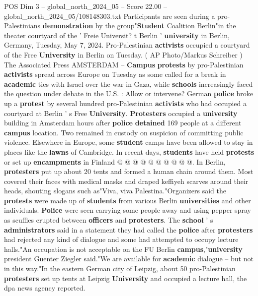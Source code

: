 \begin{textsample}{POS Dim 3 – global\_north\_2024\_05 – Score 22.00 – global\_north\_2024\_05/108148303.txt}  \label{ex:f3_pos_013}
Participants are seen during a pro-Palestinians \textbf{demonstration} by the group"\textbf{Student} Coalition Berlin"in the theater courtyard of the ' Freie Universit? t Berlin ' \textbf{university} in Berlin, Germany, Tuesday, May 7, 2024.
Pro-Palestinian \textbf{activists} occupied a courtyard of the Free \textbf{University} in Berlin on Tuesday. ( AP Photo/Markus Schreiber ) The Associated Press AMSTERDAM -- \textbf{Campus} \textbf{protests} by pro-Palestinian \textbf{activists} spread across Europe on Tuesday as some called for a break in \textbf{academic} ties with Israel over the war in Gaza, while \textbf{schools} increasingly faced the question under debate in the U.S. : Allow or intervene?
German \textbf{police} broke up a \textbf{protest} by several hundred pro-Palestinian \textbf{activists} who had occupied a courtyard at Berlin ' s Free \textbf{University}. \textbf{Protesters} occupied a \textbf{university} building in Amsterdam hours after \textbf{police} \textbf{detained} 169 people at a different \textbf{campus} location.
Two remained in custody on suspicion of committing public violence.
Elsewhere in Europe, some \textbf{student} camps have been allowed to stay in places like the \textbf{lawns} of Cambridge.
In recent days, \textbf{students} have held \textbf{protests} or set up \textbf{encampments} in Finland @ @ @ @ @ @ @ @ @ @.
In Berlin, \textbf{protesters} put up about 20 tents and formed a human chain around them.
Most covered their faces with medical masks and draped keffiyeh scarves around their heads, shouting slogans such as"Viva, viva Palestina."Organizers said the \textbf{protests} were made up of \textbf{students} from various Berlin \textbf{universities} and other individuals. \textbf{Police} were seen carrying some people away and using pepper spray as scuffles erupted between \textbf{officers} and \textbf{protesters}.
The \textbf{school} ' s \textbf{administrators} said in a statement they had called the \textbf{police} after \textbf{protesters} had rejected any kind of dialogue and some had attempted to occupy lecture halls."An occupation is not acceptable on the FU Berlin \textbf{campus},"\textbf{university} president Guenter Ziegler said."We are available for \textbf{academic} dialogue -- but not in this way."In the eastern German city of Leipzig, about 50 pro-Palestinian \textbf{protesters} set up tents at Leipzig \textbf{University} and occupied a lecture hall, the dpa news agency reported.

\end{textsample}
